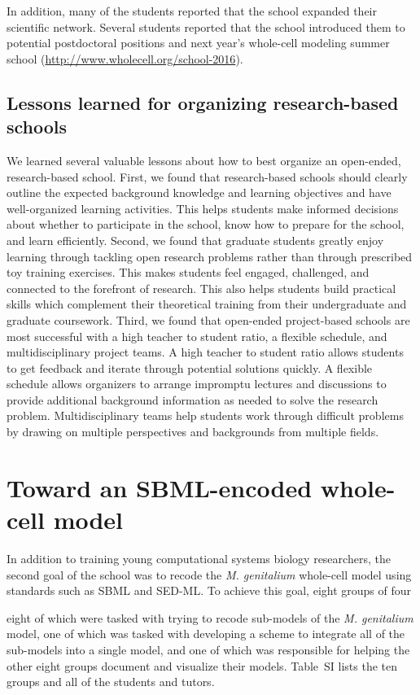 \documentclass[journal,transmag]{IEEEtran}
\begin{document}
In addition, many of the students reported that the school expanded their scientific network. 
Several students reported that the school introduced them to potential postdoctoral positions and next year's whole-cell modeling summer school (\href{http://www.wholecell.org/school-2016}{http://www.wholecell.org/school-2016}).

\subsection{Lessons learned for organizing research-based schools}
We learned several valuable lessons about how to best organize an open-ended, research-based school.
First, we found that research-based schools should clearly outline the expected background knowledge and learning objectives and have well-organized learning activities. This helps students make informed decisions about whether to participate in the school, know how to prepare for the school, and learn efficiently.
Second, we found that graduate students greatly enjoy learning through tackling open research problems rather than through prescribed toy training exercises. This makes students feel engaged, challenged, and connected to the forefront of research. This also helps students build practical skills which complement their theoretical training from their undergraduate and graduate coursework.
Third, we found that open-ended project-based schools are most successful with a high teacher to student ratio, a flexible schedule, and multidisciplinary project teams. A high teacher to student ratio allows students to get feedback and iterate through potential solutions quickly. A flexible schedule allows organizers to arrange impromptu lectures and discussions to provide additional background information as needed to solve the research problem. Multidisciplinary teams help students work through difficult problems by drawing on multiple perspectives and backgrounds from multiple fields. 

\section{Toward an SBML-encoded whole-cell model}
In addition to training young computational systems biology researchers, the second goal of the school was to recode the \textit{M. genitalium} whole-cell model using standards such as SBML and SED-ML. To achieve this goal, eight groups of four

eight of which were tasked with trying to recode sub-models of the \textit{M. genitalium} model, one of which was tasked with developing a scheme to integrate all of the sub-models into a single model, and one of which was responsible for helping the other eight groups document and visualize their models. Table~SI lists the ten groups and all of the students and tutors. 
\end{document}
